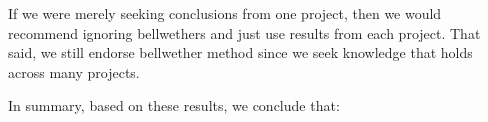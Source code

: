 \documentclass[10pt,journal,compsoc]{IEEEtran}
\begin{document}
If we were merely seeking conclusions from one project, then we would recommend ignoring bellwethers and just use results from each project. That said, we still endorse bellwether method since  we seek knowledge that holds across many projects.

In summary, based on these results, we conclude that:

\begin{blockquote}
            \end{blockquote}
\end{document}
